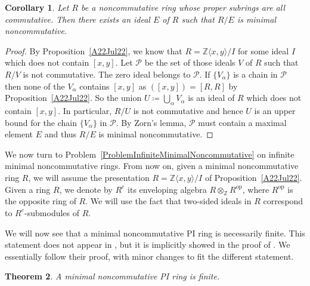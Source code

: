 \documentclass[11pt]{article}
\newtheorem{corollary}{Corollary}[section]
\newtheorem{theorem}[corollary]{Theorem}
\theoremstyle{definition}
\begin{document}
\begin{corollary}\label{OneStepNoncoHasMinimalImage}
Let $R$ be a noncommutative ring whose proper subrings are all commutative. Then there exists an ideal $E$ of $R$ such that $R/E$ is minimal noncommutative.
\end{corollary}

\begin{proof}
By Proposition~\ref{A22Jul22}, we know that $R=\mathbb{Z}\langle x,y\rangle/I$ for some ideal $I$ which does not contain $[x,y]$. Let $\mathcal{P}$ be the set of those ideals $V$ of $R$ such that $R/V$ is not commutative. The zero ideal belongs to $\mathcal{P}$. If $\lbrace V_\alpha\rbrace$ is a chain in $\mathcal{P}$ then none of the $V_\alpha$ contains $[x,y]$ as $([x,y])=[R,R]$ by Proposition~\ref{A22Jul22}. So the union $U\coloneqq\bigcup_\alpha V_\alpha$ is an ideal of $R$ which does not contain $[x,y]$. In particular, $R/U$ is not commutative and hence $U$ is an upper bound for the chain $\lbrace V_\alpha\rbrace$ in $\mathcal{P}$. By Zorn's lemma, $\mathcal{P}$ must contain a maximal element $E$ and thus $R/E$ is minimal noncommutative.
\end{proof}

We now turn to Problem~\ref{ProblemInfiniteMinimalNoncommutative} on infinite minimal noncommutative rings. From now on, given a minimal noncommutative ring $R$, we will assume the presentation $R=\mathbb{Z}\langle x,y\rangle/I$ of Proposition~\ref{A22Jul22}. Given a ring $R$, we denote by $R^e$ its enveloping algebra $R\otimes_\mathbb{Z} R^{\text{op}}$, where $R^{\text{op}}$ is the opposite ring of $R$. We will use the fact that two-sided ideals in $R$ correspond to $R^e$-submodules of $R$.

We will now see that a minimal noncommutative PI ring is necessarily finite. This statement does not appear in \cite{BellandDanchev}, but it is implicitly showed in the proof of \cite[Theorem~2.4]{BellandDanchev}. We essentially follow their proof, with minor changes to fit the different statement.

\begin{theorem}\label{PI case}
A minimal noncommutative PI ring is finite.
\end{theorem}
\end{document}

